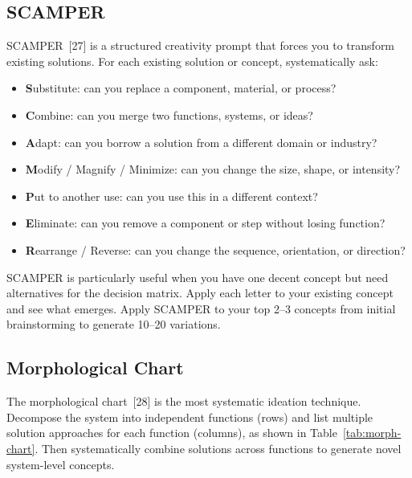 \subsection{SCAMPER}
SCAMPER~[27] is a structured creativity prompt that forces you to transform existing solutions. For each existing solution or concept, systematically ask:
\begin{itemize}[nosep,leftmargin=1.5em]
\item \textbf{S}ubstitute: can you replace a component, material, or process?
\item \textbf{C}ombine: can you merge two functions, systems, or ideas?
\item \textbf{A}dapt: can you borrow a solution from a different domain or industry?
\item \textbf{M}odify / Magnify / Minimize: can you change the size, shape, or intensity?
\item \textbf{P}ut to another use: can you use this in a different context?
\item \textbf{E}liminate: can you remove a component or step without losing function?
\item \textbf{R}earrange / Reverse: can you change the sequence, orientation, or direction?
\end{itemize}

SCAMPER is particularly useful when you have one decent concept but need alternatives for the decision matrix. Apply each letter to your existing concept and see what emerges. Apply SCAMPER to your top 2--3 concepts from initial brainstorming to generate 10--20 variations.

\subsection{Morphological Chart}
The morphological chart~[28] is the most systematic ideation technique. Decompose the system into independent functions (rows) and list multiple solution approaches for each function (columns), as shown in Table~\ref{tab:morph-chart}. Then systematically combine solutions across functions to generate novel system-level concepts.

